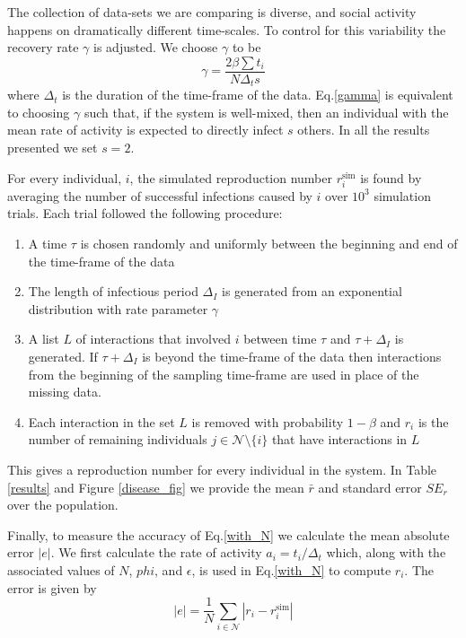 \documentclass[10pt]{article}
\begin{document}
\begin{multicols}{2}
The collection of data-sets we are comparing is diverse, and social activity happens on dramatically different time-scales. To control for this variability the recovery rate $\gamma$ is adjusted. We choose $\gamma$ to be  
\begin{equation}
\label{gamma}
\gamma=\frac{2\beta\sum t_{i}}{N \Delta_{t} s}
\end{equation}
where $\Delta_{t}$ is the duration of the time-frame of the data. Eq.\eqref{gamma} is equivalent to choosing $\gamma$ such that, if the system is well-mixed, then an individual with the mean rate of activity is expected to directly infect $s$ others. In all the results presented we set $s=2$.

For every individual, $i$, the simulated reproduction number $r_{i}^{\text{sim}}$ is found by averaging the number of successful infections caused by $i$ over $10^{3}$ simulation trials. Each trial followed the following procedure:
\begin{enumerate}
\item A time $\tau$ is chosen randomly and uniformly between the beginning and end of the time-frame of the data
\item The length of infectious period $\Delta_{I}$ is generated from an exponential distribution with rate parameter $\gamma$
\item A list $L$ of interactions that involved $i$ between time $\tau$ and $\tau+\Delta_{I}$ is generated. If $\tau+\Delta_{I}$ is beyond the time-frame of the data then interactions from the beginning of the sampling time-frame are used in place of the missing data. 
\item Each interaction in the set $L$ is removed with probability $1-\beta$ and $r_{i}$ is the number of remaining individuals $j\in\mathcal{N}\setminus\{i\}$ that have interactions in $L$ 
\end{enumerate}
This gives a reproduction number for every individual in the system. In Table \ref{results} and Figure \ref{disease_fig} we provide the mean $\bar{r}$ and standard error $SE_{r}$ over the population. 

Finally, to measure the accuracy of Eq.\eqref{with_N} we calculate the mean absolute error $|e|$. We first calculate the rate of activity $a_{i}=t_{i}/\Delta_{t}$ which, along with the associated values of $N$, $phi$, and $\epsilon$, is used in Eq.\eqref{with_N} to compute $r_{i}$. The error is given by 
\begin{equation}
|e|=\frac{1}{N}\sum_{i\in\mathcal{N}}|r_{i}-r_{i}^{\text{sim}}|
\end{equation}


\end{multicols}
\end{document}
